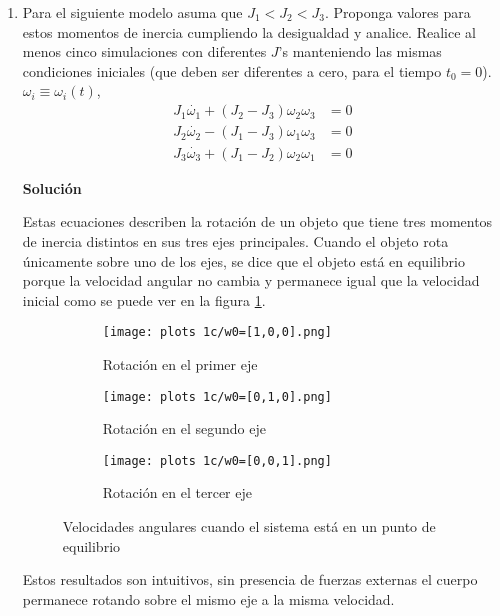 \documentclass[letterpaper, 12pt]{article}
\begin{document}
\begin{enumerate}
\begin{enumerate}
\item Para el siguiente modelo asuma que $J_1 < J_2 < J_3$. Proponga valores para estos momentos de inercia cumpliendo la desigualdad y analice. Realice al menos cinco simulaciones con diferentes $J$'s manteniendo las mismas condiciones iniciales (que deben ser diferentes a cero, para el tiempo $t_0 = 0$). $\omega_i \equiv \omega_i(t)$,
\begin{equation}
\begin{split}
    J_1\dot{\omega_1} + \left( J_2 - J_3\right)\omega_2\omega_3 &= 0 \\
    J_2\dot{\omega_2} - \left( J_1 - J_3\right)\omega_1\omega_3 &= 0 \\
    J_3\dot{\omega_3} + \left( J_1 - J_2\right)\omega_2\omega_1 &= 0
\end{split}
\end{equation}

\textbf{Solución}

Estas ecuaciones describen la rotación de un objeto que tiene tres momentos de inercia distintos en sus tres ejes principales.
Cuando el objeto rota únicamente sobre uno de los ejes, se dice que el objeto está en equilibrio porque la velocidad angular no cambia y permanece igual que la velocidad inicial como se puede ver en la figura \ref{fig:sistema en punto de equilibrio}.

\begin{figure}[H]
    \centering
    \hspace{1cm}
    \begin{subfigure}[h]{0.28\linewidth}
        \texttt{[image: plots 1c/w0=[1,0,0].png]}
        \caption{\centering Rotación en el primer eje}
    \end{subfigure}
    \begin{subfigure}[h]{0.28\linewidth}
        \texttt{[image: plots 1c/w0=[0,1,0].png]}
        \caption{\centering Rotación en el segundo eje}
    \end{subfigure}
    \begin{subfigure}[h]{0.28\linewidth}
        \texttt{[image: plots 1c/w0=[0,0,1].png]}
        \caption{\centering Rotación en el tercer eje}
    \end{subfigure}
    \caption{Velocidades angulares cuando el sistema está en un punto de equilibrio}
    \label{fig:sistema en punto de equilibrio}
\end{figure}

Estos resultados son intuitivos, sin presencia de fuerzas externas el cuerpo permanece rotando sobre el mismo eje a la misma velocidad.


\end{enumerate}
\end{enumerate}
\end{document}
